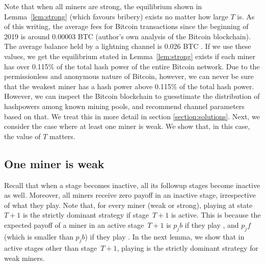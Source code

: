 Note that when all miners are strong, the equilibrium shown in Lemma~\ref{lem:strong} (which favours bribery) exists no matter how large $T$ is. As of this writing, the average fees for Bitcoin transactions since the beginning of 2019 is around 0.00003 BTC (author's own analysis of the Bitcoin blockchain). The average balance held by a lightning channel is 0.026 BTC \cite{1ml}. If we use these values, we get the equilibrium stated in Lemma~\ref{lem:strong} exists if each miner has over 0.115\% of the total hash power of the entire Bitcoin network. Due to the permissionless and anonymous nature of Bitcoin, however, we can never be sure that the weakest miner has a hash power above 0.115\% of the total hash power. However, we can inspect the Bitcoin blockchain to guesstimate the distribution of hashpowers among known mining pools, and recommend channel parameters based on that. We treat this in more detail in section \ref{section:solutions}. Next, we consider the case where at least one miner is weak. We show that, in this case, the value of $T$ matters.

\subsection{One miner is weak} \label{ss:one_miner_weak} 
Recall that when a stage becomes inactive, all its followup stages become inactive as well. Moreover, all miners receive zero payoff in an inactive stage, irrespective of what they play. Note that, for every miner (weak or strong), playing \follow{} at state~$T+1$ is the strictly dominant strategy if stage~$T+1$ is active. This is because the expected payoff of a miner in an active stage~$T+1$ is $p_jb$ if they play \follow{}, and $p_jf$ (which is smaller than $p_jb$) if they play .
In the next lemma, we show that in active stages other than stage~$T+1$, playing  is the strictly dominant strategy for weak miners.

